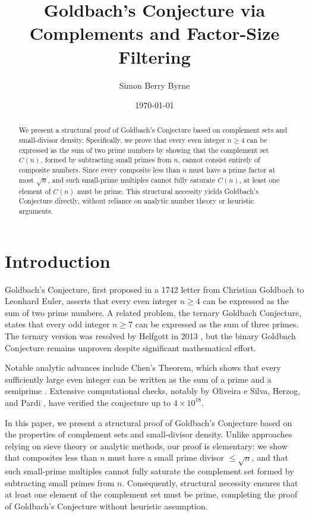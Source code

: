 \documentclass[11pt]{article}
\title{Goldbach's Conjecture via Complements and Factor-Size Filtering}
\author{Simon Berry Byrne}
\date{\today}
\begin{document}
	
	\maketitle

	\begin{abstract}
		We present a structural proof of Goldbach's Conjecture based on complement sets and small-divisor density. Specifically, we prove that every even integer \( n \geq 4 \) can be expressed as the sum of two prime numbers by showing that the complement set \( C(n) \), formed by subtracting small primes from \( n \), cannot consist entirely of composite numbers. Since every composite less than \( n \) must have a prime factor at most \( \sqrt{n} \), and such small-prime multiples cannot fully saturate \( C(n) \), at least one element of \( C(n) \) must be prime. This structural necessity yields Goldbach’s Conjecture directly, without reliance on analytic number theory or heuristic arguments.
	\end{abstract}

	
	
	\section{Introduction}
	
	Goldbach's Conjecture, first proposed in a 1742 letter from Christian Goldbach to Leonhard Euler, asserts that every even integer \( n \geq 4 \) can be expressed as the sum of two prime numbers. A related problem, the ternary Goldbach Conjecture, states that every odd integer \( n \geq 7 \) can be expressed as the sum of three primes. The ternary version was resolved by Helfgott in 2013 \cite{Helfgott2013}, but the binary Goldbach Conjecture remains unproven despite significant mathematical effort.
	
	Notable analytic advances include Chen's Theorem, which shows that every sufficiently large even integer can be written as the sum of a prime and a semiprime \cite{Chen1973}. Extensive computational checks, notably by Oliveira e Silva, Herzog, and Pardi \cite{Oliveira2014}, have verified the conjecture up to \( 4 \times 10^{18} \).
	
	In this paper, we present a structural proof of Goldbach's Conjecture based on the properties of complement sets and small-divisor density. Unlike approaches relying on sieve theory or analytic methods, our proof is elementary: we show that composites less than \( n \) must have a small prime divisor \( \leq \sqrt{n} \), and that such small-prime multiples cannot fully saturate the complement set formed by subtracting small primes from \( n \). Consequently, structural necessity ensures that at least one element of the complement set must be prime, completing the proof of Goldbach’s Conjecture without heuristic assumption.
\end{document}
